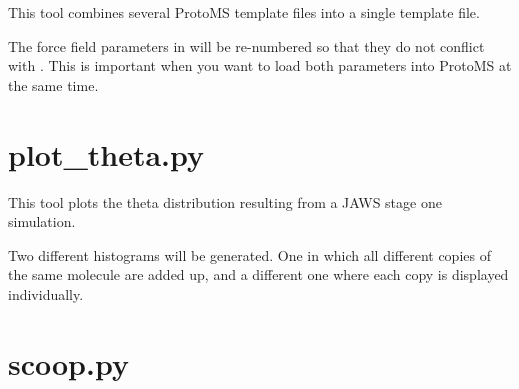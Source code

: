\documentclass[letterpaper,10pt,english]{sphinxmanual}
\begin{document}

This tool combines several ProtoMS template files into a single template file.

The force field parameters in  will be re-numbered so that they do not conflict with . This is important when you want to load both parameters into ProtoMS at the same time.


\section{plot\_theta.py}
\label{\detokenize{tools:plot-theta-py}}

%
\begin{sphinxVerbatim}[commandchars=\\\{\}]
    
    
\end{sphinxVerbatim}


This tool plots the theta distribution resulting from a JAWS stage one simulation.

Two different histograms will be generated. One in which all different copies of the same molecule are added up, and a different one where each copy is displayed individually.


\section{scoop.py}
\label{\detokenize{tools:scoop-py}}
\end{document}
